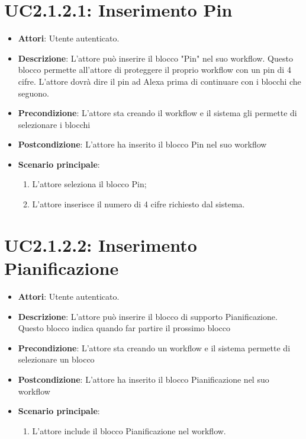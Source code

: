 \section{UC2.1.2.1: Inserimento Pin}
\label{UC2.1.2.1}
\begin{itemize}
	\item \textbf{Attori}: Utente autenticato.
	\item \textbf{Descrizione}: L'attore può inserire il blocco "Pin" nel suo workflow. Questo blocco permette all'attore di proteggere il proprio workflow con un pin di 4 cifre. L'attore dovrà dire il pin ad Alexa prima di continuare con i blocchi che seguono.
	\item \textbf{Precondizione}: L'attore sta creando il workflow e il sistema gli permette di selezionare i blocchi
	\item \textbf{Postcondizione}: L'attore ha inserito il blocco Pin nel suo workflow
	\item \textbf{Scenario principale}:
	\begin{enumerate} \item L'attore seleziona il blocco Pin;  \item 
		L'attore inserisce il numero di 4 cifre richiesto dal sistema.\end{enumerate}
\end{itemize}

\section{UC2.1.2.2: Inserimento Pianificazione}
\label{UC2.1.2.2}
\begin{itemize}
	\item \textbf{Attori}: Utente autenticato.
	\item \textbf{Descrizione}: L'attore può inserire il blocco di supporto Pianificazione. Questo blocco indica quando far partire il prossimo blocco
	\item \textbf{Precondizione}: L'attore sta creando un workflow e il sistema permette di selezionare un blocco
	\item \textbf{Postcondizione}: L'attore ha inserito il blocco Pianificazione nel suo workflow
	\item \textbf{Scenario principale}:
	\begin{enumerate} \item L'attore include il blocco Pianificazione nel workflow.\end{enumerate}
\end{itemize}

